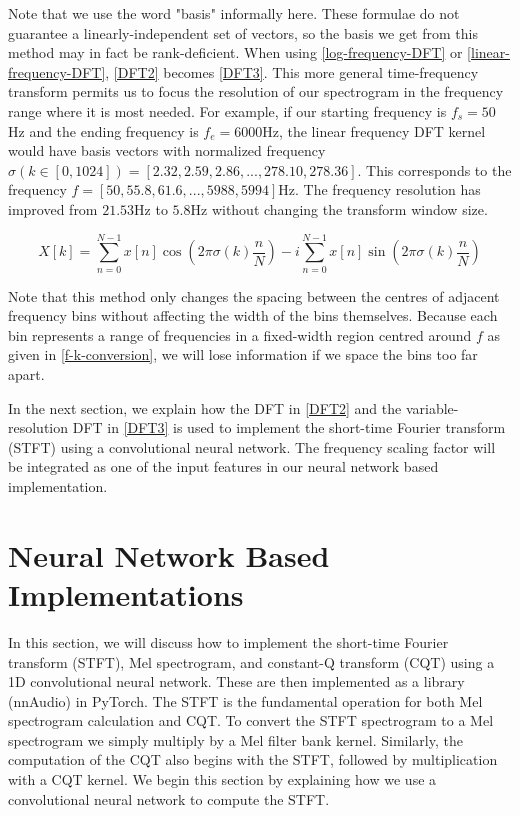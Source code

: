 \documentclass{ieeeaccess}
\begin{document}
Note that we use the word "basis" informally here. These formulae do not guarantee a linearly-independent set of vectors, so the basis we get from this method may in fact be rank-deficient. When using \eqref{log-frequency-DFT} or \eqref{linear-frequency-DFT}, \eqref{DFT2} becomes \eqref{DFT3}. This more general time-frequency transform permits us to focus the resolution of our spectrogram in the frequency range where it is most needed. For example, if our starting frequency is $f_s=50$Hz and the ending frequency is $f_e=6000$Hz, the linear frequency DFT kernel would have basis vectors with normalized frequency $\sigma(k \in [0,1024]) = [2.32,2.59,2.86, ..., 278.10,278.36]$. This corresponds to the frequency $f=[50,55.8,61.6,..., 5988,5994]$Hz. The frequency resolution has improved from $21.53$Hz to $5.8$Hz without changing the transform window size. 


\begin{equation} X[k] = \sum_{n=0}^{N-1}x[n] \cos(2\pi \sigma(k) \frac{n}{N}) - i \sum_{n=0}^{N-1}x[n]\sin(2\pi \sigma(k) \frac{n}{N})\label{DFT3}\end{equation}

Note that this method only changes the spacing between the centres of adjacent frequency bins without affecting the width of the bins themselves. Because each bin represents a range of frequencies in a fixed-width region centred around $f$ as given in \eqref{f-k-conversion}, we will lose information if we space the bins too far apart.  


In the next section, we explain how the DFT in \eqref{DFT2} and the variable-resolution DFT in \eqref{DFT3} is used to implement the short-time Fourier transform (STFT) using a convolutional neural network. The frequency scaling factor will be integrated as one of the input features in our neural network based implementation.



\section{Neural Network Based Implementations} \label{sec: PyTorch}
In this section, we will discuss how to implement the short-time Fourier transform (STFT), Mel spectrogram, and constant-Q transform (CQT) using a 1D convolutional neural network. These are then  implemented as a library (nnAudio) in PyTorch\footnotemark[\ref{nnAudio}]. The STFT is the fundamental operation for both Mel spectrogram calculation and CQT. To convert the STFT spectrogram to a Mel spectrogram we simply multiply by a Mel filter bank kernel. Similarly, the computation of the CQT also begins with the STFT, followed by multiplication with a CQT kernel. We begin this section by explaining how we use a convolutional neural network to compute the STFT.
\end{document}
